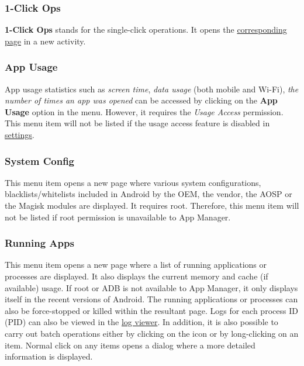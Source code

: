 \subsubsection{1-Click Ops}\label{subsubsec:main:1-click-ops} %
\textbf{1-Click Ops} stands for the single-click operations. It opens the \hyperref[sec:1-click-ops-page]{corresponding
page} in a new activity.

\subsubsection{App Usage} %
App usage statistics such as \textit{screen time}, \textit{data usage} (both mobile and Wi-Fi), \textit{the number of
times an app was opened} can be accessed by clicking on the \textbf{App Usage} option in the menu. However, it requires
the \textit{Usage Access} permission. This menu item will not be listed if the usage access feature is disabled in
\hyperref[subsec:enable/disable-features]{settings}.

\subsubsection{System Config} %
This menu item opens a new page where various system configurations, blacklists/whitelists included in Android by the
OEM, the vendor, the AOSP or the Magisk modules are displayed. It requires root. Therefore, this menu item will not be
listed if root permission is unavailable to App Manager.

\subsubsection{Running Apps}\label{subsubsec:main:running-apps} %
This menu item opens a new page where a list of running applications or processes are displayed. It also displays the
current memory and cache (if available) usage. If root or ADB is not available to App Manager, it only displays itself
in the recent versions of Android. The running applications or processes can also be force-stopped or killed within the
resultant page. Logs for each process ID (PID) can also be viewed in the \hyperref[subsubsec:log-viewer]{log viewer}.
In addition, it is also possible to carry out batch operations either by clicking on the icon or by long-clicking on an
item. Normal click on any items opens a dialog where a more detailed information is displayed.

